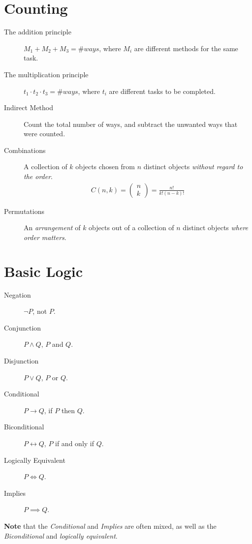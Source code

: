 \documentclass[../main.tex]{subfiles}
\begin{document}
\section{Counting}
\label{sec:counting}

\begin{description}
  \item[The addition principle] $M_1+M_2+M_3=\# ways$, where $M_i$ are
    different methods for the same task.
  \item[The multiplication principle] $t_1\cdot t_2\cdot t_3 = \# ways$, where
    $t_i$ are different tasks to be completed.
  \item[Indirect Method] Count the total number of ways, and subtract the
    unwanted ways that were counted.
  \item[Combinations] A collection of $k$ objects chosen from $n$ distinct
    objects \textit{without regard to the order}.
    \begin{align}
      C(n, k) = \begin{pmatrix}n\\k\end{pmatrix} = \frac{n!}{k!\left(n-k\right)!}
    \end{align}
  \item[Permutations] An \textit{arrangement} of $k$ objects out of a
    collection of $n$ distinct objects \textit{where order matters}.
\end{description}

\section{Basic Logic}
\label{sec:basic_logic}

\begin{description}
  \item[Negation] $\neg P$, not $P$.
  \item[Conjunction] $P\wedge Q$, $P$ and $Q$.
  \item[Disjunction] $P\vee Q$, $P$ or $Q$.
  \item[Conditional] $P\to Q$, if $P$ then $Q$.
  \item[Biconditional] $P\leftrightarrow Q$, $P$ if and only if $Q$.
  \item[Logically Equivalent] $P\iff Q$.
  \item[Implies] $P\implies Q$.
\end{description}

\textbf{Note} that the \textit{Conditional} and \textit{Implies} are often mixed,
as well as the \textit{Biconditional} and \textit{logically equivalent}.
\end{document}

